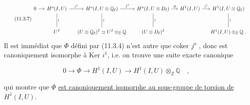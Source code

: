 \begin{equation}\tag{11.3.7}
\begin{tikzcd}[column sep=small, row sep=large]
0 \arrow[r] & H^o(I,U) \arrow[r, "i^o"] \arrow[d, dash, "\wr"] & H^o(I,U\otimes\mathbb{Q}_\ell) \arrow[r, "j^o"] \arrow[d, dash, "\wr"] & H^o(I,U\otimes D_\ell) \arrow[r, "\partial"] \arrow[d, dash, "\wr"] & H^1(I,U) \arrow[r, "i^1"] & H^1(I,U\otimes\mathbb{Q}_\ell) \arrow[d, dash, "\wr"] \\
{} & U^I & (U\otimes\mathbb{Q}_\ell)^I \simeq U^I\otimes_{\mathbb{Z}}\mathbb{Q} & (U\otimes D_\ell)^I & {} & H^1(I,U)\otimes_{\mathbb{Z}}\mathbb{Q} \;.
\end{tikzcd}
\end{equation}
Il est immédiat que $\Phi$ défini par (11.3.4) n'est autre que coker $j^o$ , donc est canoniquement isomorphe à Ker $i^1$, i.e. on trouve une suite exacte canonique

\begin{equation}\tag{11.3.8}
0 \longrightarrow \Phi \longrightarrow H^1(I,U) \longrightarrow H^1(I,U)\otimes_{\mathbb{Z}}\mathbb{Q} \quad ,
\end{equation}


qui montre que $\Phi$ \underline{est canoniquement isomorphe au sous-groupe de torsion de} $H^1(I,U)$.

